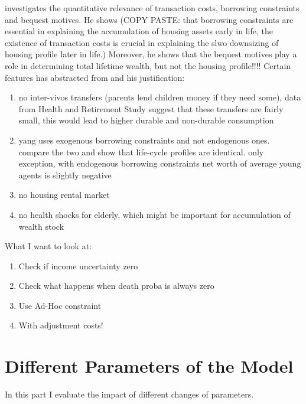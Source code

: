 \documentclass[a4paper,12pt]{article}
\begin{document}
\cite{yang2009} investigates the quantitative relevance of transaction costs, borrowing constraints and bequest motives. 
He shows (COPY PASTE: that borrowing constraints are essential in explaining the accumulation of housing assets early in life, the existence of transaction costs is crucial in explaining the slwo downsizing of housing profile later in life.)
Moreover, he shows that the bequest motives play a role in determining total lifetime wealth, but not the housing profile!!!! 
Certain features \cite{yang2009} has abstracted from and his justification:
\begin{enumerate}
\item no inter-vivos transfers (parents lend children money if they need some), data from Health and Retirement Study suggest that these transfers are fairly small, this would lead to higher durable and non-durable consumption
\item yang uses exogenous borrowing constraints and not endogenous ones. \cite{FV&K2011} compare the two and show that life-cycle profiles are identical. only exception, with endogenous borrowing constraints net worth of average young agents is slightly negative 
\item no housing rental market 
\item no health shocks for elderly, which might be important for accumulation of wealth stock
\end{enumerate}

What I want to look at:
\begin{enumerate}
\item Check if income uncertainty zero
\item Check what happens when death proba is always zero
\item Use Ad-Hoc constraint 
\item With adjustment costs!
\end{enumerate}

\label{Chapter4}

\section{Different Parameters of the Model}
In this part I evaluate the impact of different changes of parameters.
\end{document}
